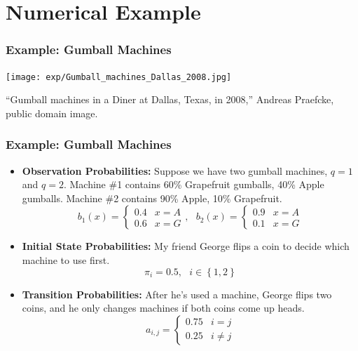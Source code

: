 \documentclass{beamer}
\begin{document}
\section[Example]{Numerical Example}
\setcounter{subsection}{1}

\begin{frame}
  \frametitle{Example: Gumball Machines}
  \centerline{\texttt{[image: exp/Gumball\_machines\_Dallas\_2008.jpg]}}
  \begin{tiny}
    ``Gumball machines in a Diner at Dallas, Texas, in 2008,'' Andreas Praefcke, public domain image.
  \end{tiny}
\end{frame}

\begin{frame}
  \frametitle{Example: Gumball Machines}
  \begin{itemize}
  \item {\bf Observation Probabilities:} Suppose we have two gumball
    machines, $q=1$ and $q=2$.  Machine \#1 contains 60\% Grapefruit
    gumballs, 40\% Apple gumballs.  Machine \#2 contains 90\%
    Apple, 10\% Grapefruit.
    \[
    b_1(x)=\begin{cases} 0.4 & x=A\\0.6 & x=G\end{cases},~~~
    b_2(x)=\begin{cases} 0.9 & x=A\\0.1 & x=G\end{cases}
    \]
  \item {\bf Initial State Probabilities:} My friend George flips a
    coin to decide which machine to use first.
    \[
    \pi_i = 0.5,~~~i\in\left\{1,2\right\}
    \]
  \item {\bf Transition Probabilities:} After he's used a machine,
    George flips two coins, and he only changes machines if both coins
    come up heads.
    \[
    a_{i,j}=\begin{cases} 0.75 & i=j\\0.25 & i\ne j\end{cases}
    \]
  \end{itemize}
\end{frame}
\end{document}
